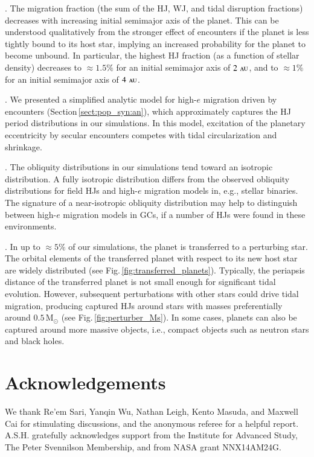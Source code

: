 \documentclass[iop,usenatbib]{emulateapj}
\renewcommand{\S}{Section}
\newcommand{\F}{Fig.}
\newcommand{\msun}{\mathrm{M}_\odot}
\newcommand{\au}{\,\textsc{au}}
\begin{document}
\medskip {}. The migration fraction (the sum of the HJ, WJ, and tidal disruption fractions) decreases with increasing initial semimajor axis of the planet. This can be understood qualitatively from the stronger effect of encounters if the planet is less tightly bound to its host star, implying an increased probability for the planet to become unbound. In particular, the highest HJ fraction (as a function of stellar density) decreases to $\approx 1.5\%$ for an initial semimajor axis of $2\,\au$, and to $\approx 1\%$ for an initial semimajor axis of $4\,\au$. 

\medskip {}. We presented a simplified analytic model for high-$e$ migration driven by encounters (\S\,\ref{sect:pop_syn:an}), which approximately captures the HJ period distributions in our simulations. In this model, excitation of the planetary eccentricity by secular encounters competes with tidal circularization and shrinkage.

\medskip {}. The obliquity distributions in our simulations tend toward an isotropic distribution. A fully isotropic distribution differs from the observed obliquity distributions for field HJs and high-$e$ migration models in, e.g., stellar binaries. The signature of a near-isotropic obliquity distribution may help to distinguish between high-$e$ migration models in GCs, if a number of HJs were found in these environments.

\medskip {}. In up to $\approx 5\%$ of our simulations, the planet is transferred to a perturbing star. The orbital elements of the transferred planet with respect to its new host star are widely distributed (see \F\,\ref{fig:transferred_planets}). Typically, the periapsis distance of the transferred planet is not small enough for significant tidal evolution. However, subsequent perturbations with other stars could drive tidal migration, producing captured HJs around stars with masses preferentially around $0.5\,\msun$ (see \F\,\ref{fig:perturber_Ms}). In some cases, planets can also be captured around more massive objects, i.e., compact objects such as neutron stars and black holes.



\section*{Acknowledgements}
We thank Re'em Sari, Yanqin Wu, Nathan Leigh, Kento Masuda, and Maxwell Cai for stimulating discussions, and the anonymous referee for a helpful report. A.S.H. gratefully acknowledges support from the Institute for Advanced Study, The Peter Svennilson Membership, and from NASA grant NNX14AM24G.




\end{document}
